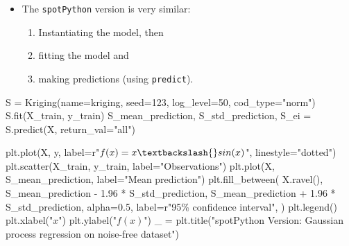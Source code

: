 \documentclass[
  letterpaper,
  DIV=11,
  numbers=noendperiod]{scrreprt}
\newenvironment{Shaded}{\begin{snugshade}}{\end{snugshade}}
\newcommand{\DecValTok}[1]{\textcolor[rgb]{0.68,0.00,0.00}{#1}}
\newcommand{\FloatTok}[1]{\textcolor[rgb]{0.68,0.00,0.00}{#1}}
\newcommand{\NormalTok}[1]{\textcolor[rgb]{0.00,0.23,0.31}{#1}}
\newcommand{\OperatorTok}[1]{\textcolor[rgb]{0.37,0.37,0.37}{#1}}
\newcommand{\SpecialCharTok}[1]{\textcolor[rgb]{0.37,0.37,0.37}{#1}}
\newcommand{\StringTok}[1]{\textcolor[rgb]{0.13,0.47,0.30}{#1}}
\newcommand{\VerbatimStringTok}[1]{\textcolor[rgb]{0.13,0.47,0.30}{#1}}
\providecommand{\tightlist}{%
  \setlength{\itemsep}{0pt}\setlength{\parskip}{0pt}}\usepackage{longtable,booktabs,array}
\begin{document}
\begin{itemize}
\tightlist
\item
  The \texttt{spotPython} version is very similar:

  \begin{enumerate}
  \def\labelenumi{\arabic{enumi}.}
  \tightlist
  \item
    Instantiating the model, then
  \item
    fitting the model and
  \item
    making predictions (using \texttt{predict}).
  \end{enumerate}
\end{itemize}

\begin{Shaded}
\begin{Highlighting}[]
\NormalTok{S }\OperatorTok{=}\NormalTok{ Kriging(name}\OperatorTok{=}\StringTok{\textquotesingle{}kriging\textquotesingle{}}\NormalTok{,  seed}\OperatorTok{=}\DecValTok{123}\NormalTok{, log\_level}\OperatorTok{=}\DecValTok{50}\NormalTok{, cod\_type}\OperatorTok{=}\StringTok{"norm"}\NormalTok{)}
\NormalTok{S.fit(X\_train, y\_train)}
\NormalTok{S\_mean\_prediction, S\_std\_prediction, S\_ei }\OperatorTok{=}\NormalTok{ S.predict(X, return\_val}\OperatorTok{=}\StringTok{"all"}\NormalTok{)}
\end{Highlighting}
\end{Shaded}

\begin{Shaded}
\begin{Highlighting}[]
\NormalTok{plt.plot(X, y, label}\OperatorTok{=}\VerbatimStringTok{r"$f(x) = x \textbackslash{}sin(x)$"}\NormalTok{, linestyle}\OperatorTok{=}\StringTok{"dotted"}\NormalTok{)}
\NormalTok{plt.scatter(X\_train, y\_train, label}\OperatorTok{=}\StringTok{"Observations"}\NormalTok{)}
\NormalTok{plt.plot(X, S\_mean\_prediction, label}\OperatorTok{=}\StringTok{"Mean prediction"}\NormalTok{)}
\NormalTok{plt.fill\_between(}
\NormalTok{    X.ravel(),}
\NormalTok{    S\_mean\_prediction }\OperatorTok{{-}} \FloatTok{1.96} \OperatorTok{*}\NormalTok{ S\_std\_prediction,}
\NormalTok{    S\_mean\_prediction }\OperatorTok{+} \FloatTok{1.96} \OperatorTok{*}\NormalTok{ S\_std\_prediction,}
\NormalTok{    alpha}\OperatorTok{=}\FloatTok{0.5}\NormalTok{,}
\NormalTok{    label}\OperatorTok{=}\VerbatimStringTok{r"95}\SpecialCharTok{\% c}\VerbatimStringTok{onfidence interval"}\NormalTok{,}
\NormalTok{)}
\NormalTok{plt.legend()}
\NormalTok{plt.xlabel(}\StringTok{"$x$"}\NormalTok{)}
\NormalTok{plt.ylabel(}\StringTok{"$f(x)$"}\NormalTok{)}
\NormalTok{\_ }\OperatorTok{=}\NormalTok{ plt.title(}\StringTok{"spotPython Version: Gaussian process regression on noise{-}free dataset"}\NormalTok{)}
\end{Highlighting}
\end{Shaded}
\end{document}
